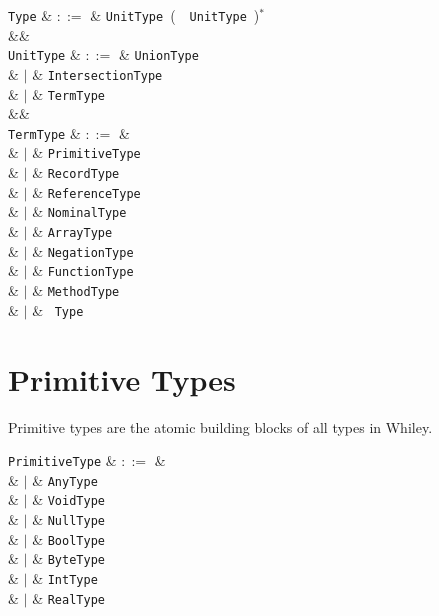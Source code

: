 \begin{syntax}
  \verb+Type+ & $::=$ & \verb+UnitType+\ \big(\ \token{,}\ \verb+UnitType+\ \big)$^*$\\
  &&\\
  \verb+UnitType+ & $::=$ & \verb+UnionType+ \\
              & $|$ & \verb+IntersectionType+ \\
              & $|$ & \verb+TermType+ \\
              &&\\
  \verb+TermType+ & $::=$ & \\
  & $|$ & \verb+PrimitiveType+ \\
  & $|$ & \verb+RecordType+ \\
  & $|$ & \verb+ReferenceType+ \\
  & $|$ & \verb+NominalType+ \\
  & $|$ & \verb+ArrayType+ \\
  & $|$ & \verb+NegationType+ \\
  & $|$ & \verb+FunctionType+ \\
  & $|$ & \verb+MethodType+ \\
  & $|$ & \token{(}\ \verb+Type+\ \token{)}\\
\end{syntax}

\section{Primitive Types}
\label{c_types_primitive_types}

Primitive types are the atomic building blocks of all types in Whiley.  

\begin{syntax}
  \verb+PrimitiveType+ & $::=$ & \\
  & $|$ & \verb+AnyType+ \\
  & $|$ & \verb+VoidType+ \\
  & $|$ & \verb+NullType+ \\
  & $|$ & \verb+BoolType+ \\
  & $|$ & \verb+ByteType+ \\
  & $|$ & \verb+IntType+ \\
  & $|$ & \verb+RealType+ \\
\end{syntax}


